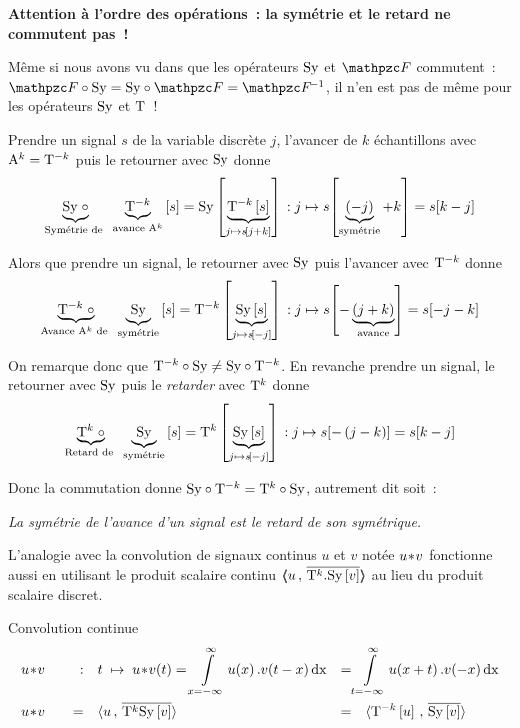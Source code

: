 \begin{remarque}
  \textbf{Attention à l'ordre des opérations~: la symétrie et le
    retard ne commutent pas~!}

  Même si nous avons vu dans  que les opérateurs
  $\mathrm{Sy}$ et $\F$ commutent~: $\F\circ\Sy=\Sy\circ\F=\Finv$, il n'en est
  pas de même pour les opérateurs $\mathrm{Sy}$ et $\mathrm{T}$~!

  Prendre un signal $s$ de la variable discrète $j$, l'avancer de $k$
  échantillons avec $\mathrm{A}^k=\mathrm{T}^{-k}$ puis le retourner avec
  $\mathrm{Sy}$ donne
  $$\underbrace{\mathrm{Sy}\;\circ}_{\text{Symétrie de }}\;\underbrace{\mathrm{T}^{-k}}_{\text{avance }\mathrm{A}^k}\left[s\right] = \mathrm{Sy}\left[\underbrace{\mathrm{T}^{-k}\left[s\right]}_{j\mapsto s\!\left[j+k\right]}\right]\,: j\mapsto s\!\left[\underbrace{\left(-j\right)}_{\text{symétrie}}+k\right]=s\!\left[k-j\right]$$

  Alors que prendre un signal, le retourner avec $\mathrm{Sy}$ puis l'avancer
  avec $\mathrm{T}^{-k}$ donne
  $$\underbrace{\mathrm{T}^{-k}\;\circ}_{\text{Avance }\mathrm{A}^k\text{ de }}\;\underbrace{\mathrm{Sy}}_{\text{symétrie}}\left[s\right]= \mathrm{T}^{-k}\left[\underbrace{\mathrm{Sy}\left[s\right]}_{j\mapsto s\!\left[-j\right]}\right]\,: j\mapsto s
  \!\left[-\underbrace{\left(j+k\right)}_{\text{avance}}\right]=s\!\left[-j-k\right]$$

  On remarque donc que $\mathrm{T}^{-k}\circ\mathrm{Sy}\neq\mathrm{Sy}\circ\mathrm{T}^{-k}$. En
  revanche prendre un signal, le retourner avec $\mathrm{Sy}$ puis le
  \emph{retarder} avec $\mathrm{T}^{k}$ donne
  $$\underbrace{\mathrm{T}^{k}\;\circ}_{\text{Retard de }}\;\underbrace{\mathrm{Sy}}_{\text{symétrie}}\left[s\right]= \mathrm{T}^{k}\left[\underbrace{\mathrm{Sy}\left[s\right]}_{j\mapsto s\!\left[-j\right]}\right]\,: j\mapsto s\!\left[-\left(j-k\right)\right]=s\!\left[k-j\right]$$

  Donc la commutation donne $\mathrm{Sy}\circ\mathrm{T}^{-k}=\mathrm{T}^{k}\circ\mathrm{Sy}$,
  autrement dit soit~:

  \emph{ \og{} La symétrie de l'avance d'un signal est le retard de
    son symétrique\fg.}
\end{remarque}

L'analogie avec la convolution de signaux continus $u$ et $v$ notée
$u\!\ast\! v$ fonctionne aussi en utilisant le produit scalaire continu
$\langle\!\!\langle u\,,\,\overline{\mathrm{T}^k.\mathrm{Sy}\left[v\right]}\rangle\!\!\rangle$ au lieu du produit scalaire
discret.

\begin{definition}{Convolution continue}
  \begin{align}
    \label{eq:convolution_continue}
    &u\conv v \quad &:& \quad  t \;\mapsto\; u\conv v\de{t} =\integ{x=-\infty}{\infty}{u\de{x}.v\de{t-x}\dx} &=& \integ{t=-\infty}{\infty}{u\de{x+t}.v\de{-x}\dx} \nonumber\\
    &u\conv v & = & \quad \scal{u}{\conj{\oret^k\Sy\b{v}}} &=& \quad\scal{\oret^{-k}\b{u}}{\conj{\Sy\b{v}}} 
  \end{align}
\end{definition}


